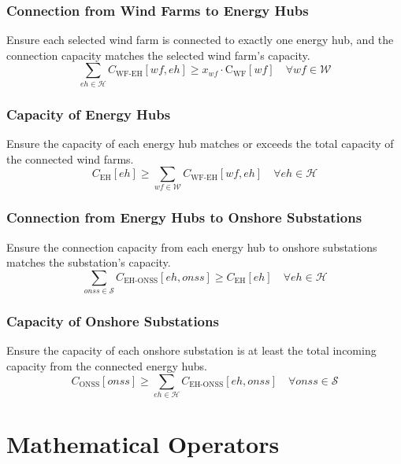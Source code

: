\subsubsection*{Connection from Wind Farms to Energy Hubs}
Ensure each selected wind farm is connected to exactly one energy hub, and the connection capacity matches the selected wind farm's capacity.
\begin{equation}
    \sum_{eh \in \mathcal{H}} C_{\text{WF-EH}}[wf, eh] \geq x_{wf} \cdot \text{C}_{\text{WF}}[wf] \quad \forall wf \in \mathcal{W}
\end{equation}

\subsubsection*{Capacity of Energy Hubs}
Ensure the capacity of each energy hub matches or exceeds the total capacity of the connected wind farms.
\begin{equation}
    C_{\text{EH}}[eh] \geq \sum_{wf \in \mathcal{W}} C_{\text{WF-EH}}[wf, eh] \quad \forall eh \in \mathcal{H}
\end{equation}

\subsubsection*{Connection from Energy Hubs to Onshore Substations}
Ensure the connection capacity from each energy hub to onshore substations matches the substation's capacity.
\begin{equation}
    \sum_{onss \in \mathcal{S}} C_{\text{EH-ONSS}}[eh, onss] \geq C_{\text{EH}}[eh] \quad \forall eh \in \mathcal{H}
\end{equation}

\subsubsection*{Capacity of Onshore Substations}
Ensure the capacity of each onshore substation is at least the total incoming capacity from the connected energy hubs.
\begin{equation}
    C_{\text{ONSS}}[onss] \geq \sum_{eh \in \mathcal{H}} C_{\text{EH-ONSS}}[eh, onss] \quad \forall onss \in \mathcal{S}
\end{equation}

\section*{Mathematical Operators}


